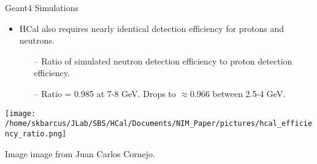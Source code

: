 \documentclass[10pt]{beamer}
\begin{document}
\begin{frame}{Geant4 Simulations}

	\begin{itemize}
		\item HCal also requires nearly identical detection efficiency for protons and neutrons. 
			\begin{itemize}
				\item[--] Ratio of simulated neutron detection efficiency to proton detection efficiency. 
				\item[--] Ratio = 0.985 at 7-8 GeV. Drops to $\approx$0.966 between 2.5-4 GeV.
			\end{itemize}
	\end{itemize}
	
	\vspace{-1mm}
	\begin{center}
  		\texttt{[image: /home/skbarcus/JLab/SBS/HCal/Documents/NIM\_Paper/pictures/hcal\_efficiency\_ratio.png]}
  	\end{center}
  	\vspace{-4mm}
  	\tiny{Image image from Juan Carlos Cornejo.}

\end{frame}
\end{document}
